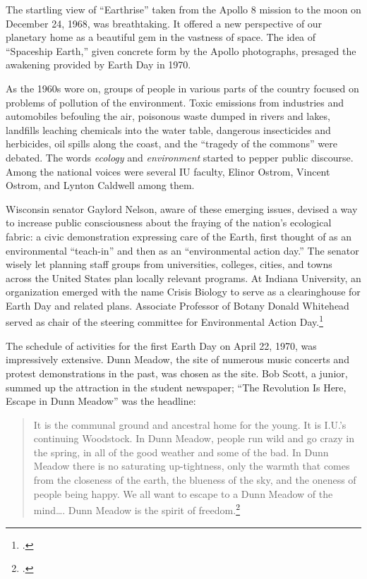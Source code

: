 \documentclass[
  american,
  letterpaper,
]{scrreprt}
\begin{document}
The startling view of ``Earthrise'' taken from the Apollo 8 mission to
the moon on December 24, 1968, was breathtaking. It offered a new
perspective of our planetary home as a beautiful gem in the vastness of
space. The idea of ``Spaceship Earth,'' given concrete form by the
Apollo photographs, presaged the awakening provided by Earth Day in
1970.

As the 1960s wore on, groups of people in various parts of the country
focused on problems of pollution of the environment. Toxic emissions
from industries and automobiles befouling the air, poisonous waste
dumped in rivers and lakes, landfills leaching chemicals into the water
table, dangerous insecticides and herbicides, oil spills along the
coast, and the ``tragedy of the commons'' were debated. The words
\emph{ecology} and \emph{environment} started to pepper public
discourse. Among the national voices were several IU faculty, Elinor
Ostrom, Vincent Ostrom, and Lynton Caldwell among them.

Wisconsin senator Gaylord Nelson, aware of these emerging issues,
devised a way to increase public consciousness about the fraying of the
nation's ecological fabric: a civic demonstration expressing care of the
Earth, first thought of as an environmental ``teach-in'' and then as an
``environmental action day.'' The senator wisely let planning staff
groups from universities, colleges, cities, and towns across the United
States plan locally relevant programs. At Indiana University, an
organization emerged with the name Crisis Biology to serve as a
clearinghouse for Earth Day and related plans. Associate Professor of
Botany Donald Whitehead served as chair of the steering committee for
Environmental Action Day.\footnote{.}

The schedule of activities for the first Earth Day on April 22, 1970,
was impressively extensive. Dunn Meadow, the site of numerous music
concerts and protest demonstrations in the past, was chosen as the site.
Bob Scott, a junior, summed up the attraction in the student newspaper;
``The Revolution Is Here, Escape in Dunn Meadow'' was the headline:

\begin{quote}
It is the communal ground and ancestral home for the young. It is I.U.'s
continuing Woodstock. In Dunn Meadow, people run wild and go crazy in
the spring, in all of the good weather and some of the bad. In Dunn
Meadow there is no saturating up-tightness, only the warmth that comes
from the closeness of the earth, the blueness of the sky, and the
oneness of people being happy. We all want to escape to a Dunn Meadow of
the mind\ldots. Dunn Meadow is the spirit of freedom.\footnote{.}
\end{quote}
\end{document}
